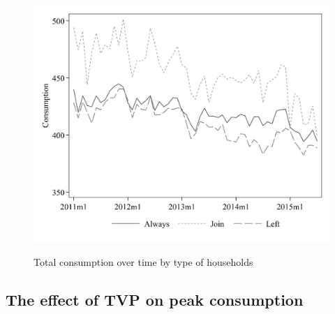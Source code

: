 \begin{figure}[ht]
  \caption{Total consumption over time by type of households}\label{fig:sixteen}
  \begin{center}
  {\includegraphics[width=1\textwidth]{./figures/image16.png}}
  \end{center}
\end{figure}

\FloatBarrier

\clearpage

\subsection{The effect of TVP on peak consumption}\label{appendix:E}

